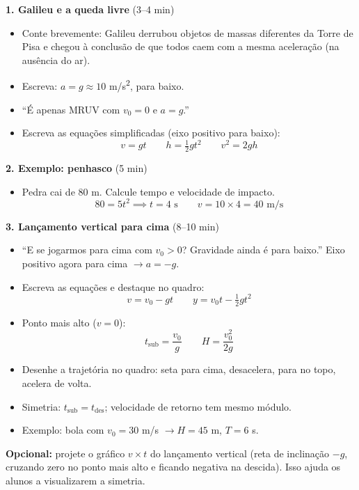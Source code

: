 \documentclass[12pt,a4paper]{article}
\begin{document}
\begin{tcolorbox}[quadrobox]
  \textbf{1. Galileu e a queda livre} (3--4 min)
  \begin{itemize}[nosep]
    \item Conte brevemente: Galileu derrubou objetos de massas diferentes
          da Torre de Pisa e chegou \`a conclus\~ao de que todos caem com
          a mesma acelera\c{c}\~ao (na aus\^encia do ar).
    \item Escreva: $a = g \approx 10$ m/s\textsuperscript{2}, para baixo.
    \item ``\'E apenas MRUV com $v_0 = 0$ e $a = g$.''
    \item Escreva as equa\c{c}\~oes simplificadas (eixo positivo para baixo):
    \[
      v = gt \qquad h = \tfrac{1}{2}gt^2 \qquad v^2 = 2gh
    \]
  \end{itemize}

  \medskip
  \textbf{2. Exemplo: penhasco} (5 min)
  \begin{itemize}[nosep]
    \item Pedra cai de 80 m. Calcule tempo e velocidade de impacto.
    \[
      80 = 5t^2 \implies t = 4\text{ s} \qquad v = 10\times4 = 40\text{ m/s}
    \]
  \end{itemize}

  \medskip
  \textbf{3. Lan\c{c}amento vertical para cima} (8--10 min)
  \begin{itemize}[nosep]
    \item ``E se jogarmos para cima com $v_0 > 0$? Gravidade ainda \'e para
          baixo.'' Eixo positivo agora para cima $\to a = -g$.
    \item Escreva as equa\c{c}\~oes e destaque no quadro:
    \[
      v = v_0 - gt \qquad y = v_0 t - \tfrac{1}{2}gt^2
    \]
    \item Ponto mais alto ($v = 0$):
    \[
      t_{\text{sub}} = \frac{v_0}{g} \qquad H = \frac{v_0^2}{2g}
    \]
    \item Desenhe a trajet\'oria no quadro: seta para cima, desacelera,
          para no topo, acelera de volta.
    \item Simetria: $t_{\text{sub}} = t_{\text{des}}$; velocidade de
          retorno tem mesmo m\'odulo.
    \item Exemplo: bola com $v_0 = 30$ m/s $\to H = 45$ m, $T = 6$ s.
  \end{itemize}
\end{tcolorbox}

\begin{tcolorbox}[projetorbox]
  \textbf{Opcional:} projete o gr\'afico $v \times t$ do lan\c{c}amento
  vertical (reta de inclina\c{c}\~ao $-g$, cruzando zero no ponto mais
  alto e ficando negativa na descida). Isso ajuda os alunos a visualizarem
  a simetria.
\end{tcolorbox}
\end{document}
